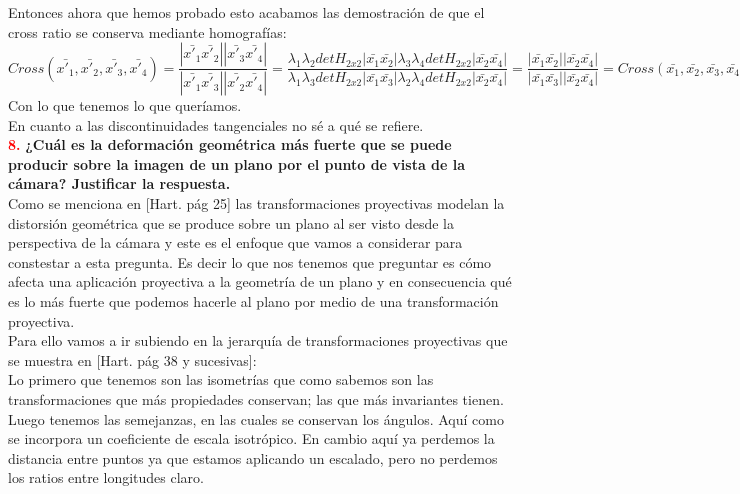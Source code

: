 \documentclass[10pt,a4paper]{article}
\begin{document}
Entonces ahora que hemos probado esto acabamos las demostración de que el cross ratio se conserva mediante homografías:\\

$Cross(\bar{x'_1},\bar{x'_2},\bar{x'_3},\bar{x'_4}) = \dfrac{|\bar{x'_1}\bar{x'_2}||\bar{x'_3}\bar{x'_4}|}{|\bar{x'_1}\bar{x'_3}||\bar{x'_2}\bar{x'_4}|} = \dfrac{\lambda_1\lambda_2detH_{2x2}|\bar{x_1}\bar{x_2}|\lambda_3\lambda_4detH_{2x2}|\bar{x_2}\bar{x_4}|}{\lambda_1\lambda_3detH_{2x2}|\bar{x_1}\bar{x_3}|\lambda_2\lambda_4detH_{2x2}|\bar{x_2}\bar{x_4}|}=\dfrac{|\bar{x_1}\bar{x_2}||\bar{x_2}\bar{x_4}|}{|\bar{x_1}\bar{x_3}||\bar{x_2}\bar{x_4}|} = Cross(\bar{x_1},\bar{x_2},\bar{x_3},\bar{x_4})$\\

Con lo que tenemos lo que queríamos.\\

En cuanto a las discontinuidades tangenciales no sé a qué se refiere.\\

\textcolor{red}{\textbf{8.}} \textbf{¿Cuál es la deformación geométrica más fuerte que se puede producir sobre la imagen de un plano por el punto de vista de la cámara? Justificar la respuesta.}\\

Como se menciona en [Hart. pág 25] las transformaciones proyectivas modelan la distorsión geométrica que se produce sobre un plano al ser visto desde la perspectiva de la cámara y este es el enfoque que vamos a considerar para constestar a esta pregunta. Es decir lo que nos tenemos que preguntar es cómo afecta una aplicación proyectiva a la geometría de un plano y en consecuencia qué es lo más fuerte que podemos hacerle al plano por medio de una transformación proyectiva.\\

Para ello vamos a ir subiendo en la jerarquía de transformaciones proyectivas que se muestra en [Hart. pág 
38 y sucesivas]:\\

Lo primero que tenemos son las isometrías que como sabemos son las transformaciones que más propiedades conservan; las que más invariantes tienen.\\

Luego tenemos las semejanzas, en las cuales se conservan los ángulos. Aquí como se incorpora un coeficiente de escala isotrópico. En cambio aquí ya perdemos la distancia entre puntos ya que estamos aplicando un escalado, pero no perdemos los ratios entre longitudes claro.\\
\end{document}
